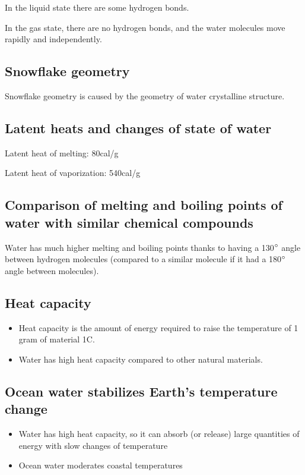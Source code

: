 In the liquid state there are some hydrogen bonds.

In the gas state, there are no hydrogen bonds, and the water molecules move
rapidly and independently.

\subsection{Snowflake geometry}

Snowflake geometry is caused by the geometry of water crystalline structure.

\subsection{Latent heats and changes of state of water}

Latent heat of melting: 80cal/g

Latent heat of vaporization: 540cal/g

\subsection{Comparison of melting and boiling points of water with similar
chemical compounds}

Water has much higher melting and boiling points thanks to having a
130$\degree$ angle between hydrogen molecules (compared to a similar
molecule if it had a 180$\degree$ angle between molecules).

\subsection{Heat capacity}

\begin{itemize}
    \item Heat capacity is the amount of energy required to raise the
        temperature of 1 gram of material 1C.
    \item Water has high heat capacity compared to other natural
        materials.
\end{itemize}

\subsection{Ocean water stabilizes Earth's temperature change}

\begin{itemize}
    \item Water has high heat capacity, so it can absorb (or release)
        large quantities of energy with slow changes of temperature
    \item Ocean water moderates coastal temperatures
\end{itemize}

